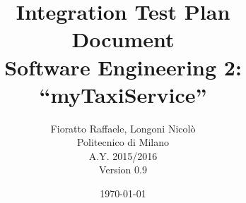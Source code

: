 \begin{figure}
  \centering
	\def\svgwidth{\columnwidth}
    \resizebox{0.66\textwidth}{!}{}
\end{figure}
\title{{\Huge \textbf{I}ntegration \textbf{T}est \textbf{P}lan \\ \textbf{D}ocument}\\{\Large Software Engineering 2: ``myTaxiService''}}

\author{Fioratto Raffaele, Longoni Nicol\`{o}
\\Politecnico di Milano
\\{\small A.Y. 2015/2016}
\\{\small Version 0.9}}
\date{\today}
\maketitle
\newpage
\tableofcontents
\break
\listoffigures